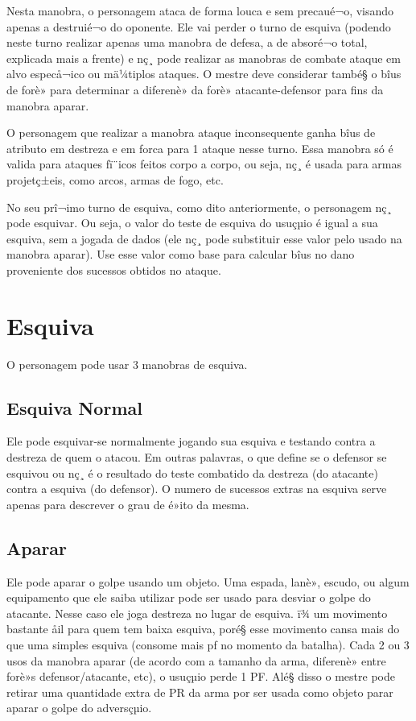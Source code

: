 Nesta manobra, o personagem ataca de forma louca e sem precaué¬o, visando apenas a destruié¬o do oponente. Ele vai perder o turno de esquiva (podendo neste turno realizar apenas uma manobra de defesa, a de absoré¬o total, explicada mais a frente) e nç¸ pode realizar as manobras de combate ataque em alvo especå¬ico ou mä¼tiplos ataques. O mestre deve considerar també§ o bîus de forè» para determinar a diferenè» da forè» atacante-defensor para fins da manobra aparar.

O personagem que realizar a manobra ataque inconsequente ganha bîus de atributo em destreza e em forca para 1 ataque nesse turno. Essa manobra só é valida para ataques fï¨icos feitos corpo a corpo, ou seja, nç¸ é usada para armas projetç±eis, como arcos, armas de fogo, etc. 

No seu prî¬imo turno de esquiva, como dito anteriormente, o personagem nç¸ pode esquivar. Ou seja, o valor do teste de esquiva do usuçµio é igual a sua esquiva, sem a jogada de dados (ele nç¸ pode substituir esse valor pelo usado na manobra aparar). Use esse valor como base para calcular bîus no dano proveniente dos sucessos obtidos no ataque.

\section{Esquiva}

O personagem pode usar 3 manobras de esquiva.

\subsection{Esquiva Normal}

Ele pode esquivar-se normalmente jogando sua esquiva e testando contra a destreza de quem o atacou. Em outras palavras, o que define se o defensor se esquivou ou nç¸ é o resultado do teste combatido da destreza (do atacante) contra a esquiva (do defensor). O numero de sucessos extras na esquiva serve apenas para descrever o grau de é»ito da mesma.

\subsection{Aparar}

Ele pode aparar o golpe usando um objeto. Uma espada, lanè», escudo, ou algum equipamento que ele saiba utilizar pode ser usado para desviar o golpe do atacante. Nesse caso ele joga destreza no lugar de esquiva. ï¾ um movimento bastante åil para quem tem baixa esquiva, poré§ esse movimento cansa mais do que uma simples esquiva (consome mais pf no momento da batalha). Cada 2 ou 3 usos da manobra aparar (de acordo com a tamanho da arma, diferenè» entre forè»s defensor/atacante, etc), o usuçµio perde 1 PF. Alé§ disso o mestre pode retirar uma quantidade extra de PR da arma por ser usada como objeto parar aparar o golpe do adversçµio.

